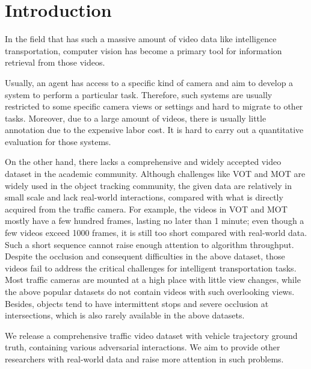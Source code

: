 \section{Introduction}

In the field that has such a massive amount of video data like intelligence transportation, computer vision has become a primary tool for information retrieval from those videos.

Usually, an agent has access to a specific kind of camera and aim to develop a system to perform a particular task.
Therefore, such systems are usually restricted to some specific camera views or settings and hard to migrate to other tasks.
Moreover, due to a large amount of videos, there is usually little annotation due to the expensive labor cost. 
It is hard to carry out a quantitative evaluation for those systems.

On the other hand, there lacks a comprehensive and widely accepted video dataset in the academic community.
Although challenges like VOT \cite{kristan2017visual} and MOT \cite{milan2016mot16} are widely used in the object tracking community, the given data are relatively in small scale and lack real-world interactions, compared with what is directly acquired from the traffic camera.
For example, the videos in VOT and MOT mostly have a few hundred frames, lasting no later than 1 minute; even though a few videos exceed 1000 frames, it is still too short compared with real-world data.
Such a short sequence cannot raise enough attention to algorithm throughput.
Despite the occlusion and consequent difficulties in the above dataset, those videos fail to address the critical challenges for intelligent transportation tasks.
Most traffic cameras are mounted at a high place with little view changes, while the above popular datasets do not contain videos with such overlooking views. 
Besides, objects tend to have intermittent stops and severe occlusion at intersections, which is also rarely available in the above datasets. 

We release a comprehensive traffic video dataset with vehicle trajectory ground truth, containing various adversarial interactions. 
We aim to provide other researchers with real-world data and raise more attention in such problems.